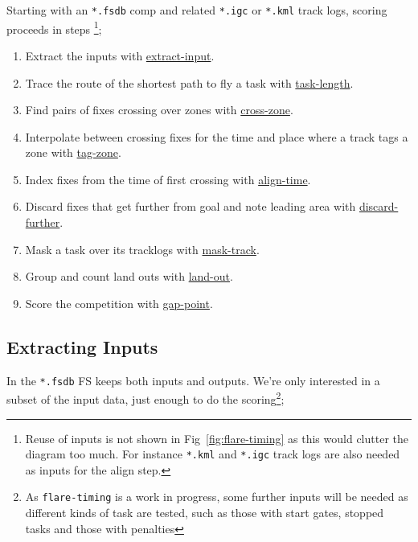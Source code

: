 \documentclass[gap.tex]{subfiles}
\begin{document}
Starting with an \texttt{*.fsdb} comp and related \texttt{*.igc} or
\texttt{*.kml} track logs, scoring proceeds in steps \footnote{ Reuse of inputs
is not shown in Fig~\ref{fig:flare-timing} as this would clutter the diagram
too much. For instance \texttt{*.kml} and \texttt{*.igc} track logs are also
needed as inputs for the {\color{csv}align} step.};
\begin{enumerate}
    \item
        Extract the inputs with
        \href{https://github.com/BlockScope/flare-timing/tree/master/flare-timing/prod-apps/extract-input}{extract-input}.
    \item
        Trace the route of the shortest path to fly a task with
        \href{https://github.com/BlockScope/flare-timing/tree/master/flare-timing/prod-apps/task-length}{task-length}.
    \item
        Find pairs of fixes crossing over zones with
        \href{https://github.com/BlockScope/flare-timing/tree/master/flare-timing/prod-apps/cross-zone}{cross-zone}.
    \item
        Interpolate between crossing fixes for the time and place where a track
        tags a zone with
        \href{https://github.com/BlockScope/flare-timing/tree/master/flare-timing/prod-apps/tag-zone}{tag-zone}.
    \item
        Index fixes from the time of first crossing with
        \href{https://github.com/BlockScope/flare-timing/tree/master/flare-timing/prod-apps/align-time}{align-time}.
    \item
        Discard fixes that get further from goal and note leading area with
        \href{https://github.com/BlockScope/flare-timing/tree/master/flare-timing/prod-apps/discard-further}{discard-further}.
    \item
        Mask a task over its tracklogs with
        \href{https://github.com/BlockScope/flare-timing/tree/master/flare-timing/prod-apps/mask-track}{mask-track}.
    \item
        Group and count land outs with
        \href{https://github.com/BlockScope/flare-timing/tree/master/flare-timing/prod-apps/land-out}{land-out}.
    \item
        Score the competition with
        \href{https://github.com/BlockScope/flare-timing/tree/master/flare-timing/prod-apps/gap-point}{gap-point}.  
\end{enumerate}

\newpage
\subsection{Extracting Inputs}
In the \texttt{*.fsdb} FS keeps both inputs and outputs. We're only interested
in a subset of the input data, just enough to do the scoring\footnote{As
\texttt{flare-timing} is a work in progress, some further inputs will be needed
as different kinds of task are tested, such as those with start gates, stopped
tasks and those with penalties};
\end{document}
